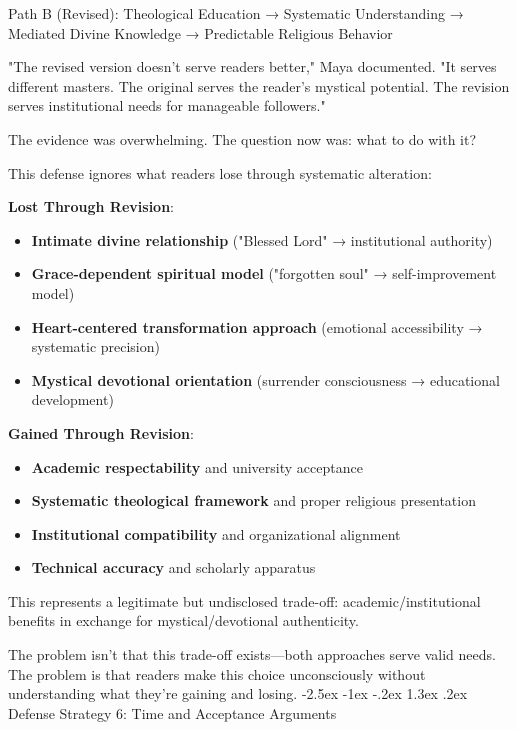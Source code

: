 \documentclass[12pt,twoside]{book}
\makeatletter
\renewcommand\section{\@startsection{section}{1}{\z@}%
{-2.5ex \@plus -1ex \@minus -.2ex}%
{1.3ex \@plus.2ex}%
{\normalfont\Large\bfseries}}
\makeatother
\begin{document}
Path B (Revised):
Theological Education → Systematic Understanding → Mediated Divine Knowledge → Predictable Religious Behavior

"The revised version doesn't serve readers better," Maya documented. "It serves different masters. The original serves the reader's mystical potential. The revision serves institutional needs for manageable followers."

The evidence was overwhelming. The question now was: what to do with it?

This defense ignores what readers lose through systematic alteration:

\textbf{\textbf{Lost Through Revision}}:
\begin{itemize}
\item \textbf{\textbf{Intimate divine relationship}} ("Blessed Lord" → institutional authority)
\item \textbf{\textbf{Grace-dependent spiritual model}} ("forgotten soul" → self-improvement model)
\item \textbf{\textbf{Heart-centered transformation approach}} (emotional accessibility → systematic precision)
\item \textbf{\textbf{Mystical devotional orientation}} (surrender consciousness → educational development)
\end{itemize}

\textbf{\textbf{Gained Through Revision}}:
\begin{itemize}
\item \textbf{\textbf{Academic respectability}} and university acceptance
\item \textbf{\textbf{Systematic theological framework}} and proper religious presentation
\item \textbf{\textbf{Institutional compatibility}} and organizational alignment
\item \textbf{\textbf{Technical accuracy}} and scholarly apparatus
\end{itemize}

This represents a legitimate but undisclosed trade-off: academic/institutional benefits in exchange for mystical/devotional authenticity.

The problem isn't that this trade-off exists—both approaches serve valid needs. The problem is that readers make this choice unconsciously without understanding what they're gaining and losing.
\section{Defense Strategy 6: Time and Acceptance Arguments}
\label{sec:orgd34edff}
\end{document}
